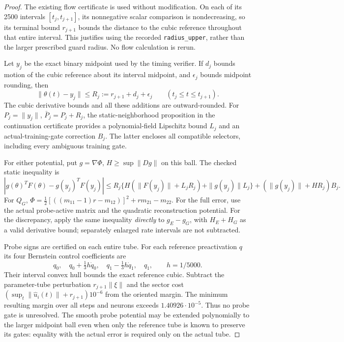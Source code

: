 \begin{proof}
The existing flow certificate is used without modification. On each of its
2500 intervals $[t_j,t_{j+1}]$, its nonnegative scalar comparison is
nondecreasing, so its terminal bound $r_{j+1}$ bounds the distance to the
cubic reference throughout that entire interval. This justifies using the
recorded \texttt{radius\_upper}, rather than the larger prescribed guard
radius. No flow calculation is rerun.

Let $y_j$ be the exact binary midpoint used by the timing verifier. If
$d_j$ bounds motion of the cubic reference about its interval midpoint,
and $\epsilon_j$ bounds midpoint rounding, then
\[
 \|\theta(t)-y_j\|\le R_j:=r_{j+1}+d_j+\epsilon_j
 \qquad(t_j\le t\le t_{j+1}).
\]
The cubic derivative bounds and all these additions are outward-rounded.
For $P_j=\|y_j\|$, $\bar P_j=P_j+R_j$, the static-neighborhood proposition
in the continuation certificate provides a polynomial-field Lipschitz bound
$L_j$ and an actual-training-gate correction $B_j$. The latter encloses
all compatible selectors, including every ambiguous training gate.

For either potential, put $g=\nabla\Phi$, $H\ge\sup\|Dg\|$ on this ball.
The checked static inequality is
\[
 |g(\theta)^TF(\theta)-g(y_j)^TF(y_j)|
 \le R_j\{H(\|F(y_j)\|+L_jR_j)+\|g(y_j)\|L_j\}
       +(\|g(y_j)\|+HR_j)B_j.
\]
For $Q_G$, $\Phi=\tfrac12[((m_{11}-1)r-m_{12})]^2+rm_{21}-m_{22}$.
For the full error, use the actual probe-active matrix and the quadratic
reconstruction potential. For the discrepancy, apply the same inequality
\emph{directly} to $g_E-g_G$, with $H_E+H_G$ as a valid derivative bound;
separately enlarged rate intervals are not subtracted.

Probe signs are certified on each entire tube. For each reference
preactivation $q$ its four Bernstein control coefficients are
\[
 q_0,\quad q_0+\tfrac{1}{3}h\dot q_0,\quad
 q_1-\tfrac{1}{3}h\dot q_1,\quad q_1,\qquad h=1/5000.
\]
Their interval convex hull bounds the exact reference cubic. Subtract the
parameter-tube perturbation $r_{j+1}\|\xi\|$ and the sector cost
$(\sup_t\|\widehat u_i(t)\|+r_{j+1})10^{-6}$ from the oriented margin.
The minimum resulting margin over all steps and neurons exceeds
$1.40926\cdot10^{-5}$. Thus no probe gate is unresolved. The smooth probe
potential may be extended polynomially to the larger midpoint ball even
when only the reference tube is known to preserve its gates: equality with
the actual error is required only on the actual tube.


\end{proof}
